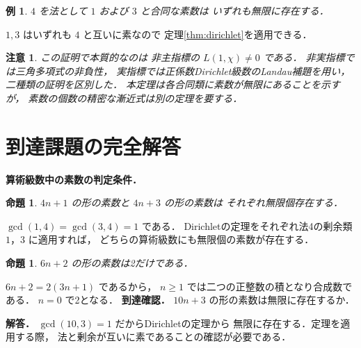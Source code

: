 \documentclass[a5paper,10pt,onecolumn]{jsarticle}
\makeatletter
\theoremstyle{mathnotetheorem}
\newtheorem{proposition}[theorem]{命題}
\newtheorem{example}[theorem]{例}
\newtheorem{remark}[theorem]{注意}
\renewcommand{\proofname}{証明}
\renewenvironment{proof}[1][\proofname]{%
  \par\pushQED{\qed}\normalfont\topsep4\p@\@plus2\p@\relax
  \trivlist\item[\hskip\labelsep\bfseries #1]\ignorespaces
}{\popQED\endtrivlist\@endpefalse}
\makeatother
\begin{document}
\begin{example}
$4$ を法として $1$ および $3$ と合同な素数は
いずれも無限に存在する．
\end{example}
\begin{proof}
$1,3$ はいずれも $4$ と互いに素なので
定理\ref{thm:dirichlet}を適用できる．
\end{proof}

\begin{remark}
この証明で本質的なのは
非主指標の $L(1,\chi)\ne0$ である．
非実指標では三角多項式の非負性，
実指標では正係数Dirichlet級数のLandau補題を用い，
二種類の証明を区別した．
本定理は各合同類に素数が無限にあることを示すが，
素数の個数の精密な漸近式は別の定理を要する．
\end{remark}

\section{到達課題の完全解答}
\noindent\textbf{算術級数中の素数の判定条件．}
\begin{proposition}
$4n+1$ の形の素数と $4n+3$ の形の素数は
それぞれ無限個存在する．
\end{proposition}
\begin{proof}
$\gcd(1,4)=\gcd(3,4)=1$ である．
Dirichletの定理をそれぞれ法4の剰余類
$1$，$3$ に適用すれば，
どちらの算術級数にも無限個の素数が存在する．
\end{proof}
\begin{proposition}
$6n+2$ の形の素数は2だけである．
\end{proposition}
\begin{proof}
$6n+2=2(3n+1)$ であるから，
$n\ge1$ では二つの正整数の積となり合成数である．
$n=0$ で2となる．
\end{proof}
\noindent\textbf{到達確認．}
$10n+3$ の形の素数は無限に存在するか．
\par\noindent\textbf{解答．}
$\gcd(10,3)=1$ だからDirichletの定理から
無限に存在する．定理を適用する際，
法と剰余が互いに素であることの確認が必要である．
\end{document}
